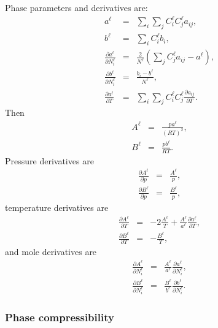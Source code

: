 Phase parameters and derivatives are:
\begin{eqnarray}
  a^\ell & = & \sum_i \sum_j C_i^\ell C_j^\ell a_{ij}, \\
  b^\ell & = & \sum_i C_i^\ell b_i, \\
  \frac{\partial a^\ell}{\partial N_i^\ell} & = &
  \frac{2}{N^\ell} \left(
    \sum_j C_j^\ell a_{ij} - a^\ell \right), \\
  \frac{\partial b^\ell}{\partial N_i^\ell} & = &
  \frac{b_i - b^\ell}{N^\ell}, \\
  \frac{\partial a^\ell}{\partial T} & = &
  \sum_i \sum_j C_i^\ell C_j^\ell \frac{\partial a_{ij}}{\partial T}.
\end{eqnarray}
Then
\begin{eqnarray}
  A^\ell & = & \frac{p a^\ell}{(RT)^2}, \\
  B^\ell & = & \frac{p b^\ell}{RT}.
\end{eqnarray}
Pressure derivatives are
\begin{eqnarray}
  \frac{\partial A^\ell}{\partial p} & = & \frac{A^\ell}{p}, \\
  \frac{\partial B^\ell}{\partial p} & = & \frac{B^\ell}{p},
\end{eqnarray}
temperature derivatives are
\begin{eqnarray}
  \frac{\partial A^\ell}{\partial T} & = & -2\frac{A^\ell}{T} +
  \frac{A^\ell}{a^\ell} \frac{\partial a^\ell}{\partial T}, \\
  \frac{\partial B^\ell}{\partial T} & = & -\frac{B^\ell}{T},
\end{eqnarray}
and mole derivatives are
\begin{eqnarray}
  \frac{\partial A^\ell}{\partial N_i^\ell} & = &
  \frac{A^\ell}{a^\ell} \frac{\partial a^\ell}{\partial N_i^\ell}, \\
  \frac{\partial B^\ell}{\partial N_i^\ell} & = &
  \frac{B^\ell}{b^\ell} \frac{\partial b^\ell}{\partial N_i^\ell}.
\end{eqnarray}


\subsubsection{Phase compressibility}

